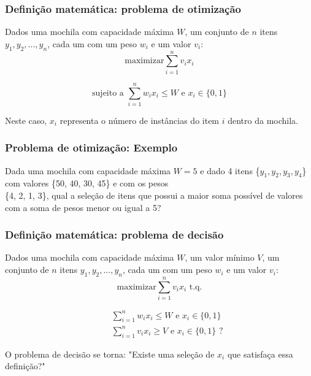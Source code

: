 \documentclass{beamer}
\begin{document}
\begin{frame}
\frametitle{Definição matemática: problema de otimização}

    Dados uma mochila com capacidade máxima $W$, um conjunto de $n$ itens $y_{1}, y_{2}, ..., y_{n}$,
    cada um com um peso $w_{i}$ e um valor $v_{i}$:\\

    \begin{equation*}
        \text{maximizar} \sum_{i=1}^{n} v_{i} x_{i}
    \end{equation*}

    \begin{equation*}
        \mbox{sujeito a } \sum_{i=1}^{n} w_{i} x_{i} \leq W \mbox{ e } x_{i} \in \{0,1\}
    \end{equation*}

    Neste caso, $x_{i}$ representa o número de instâncias do item $i$ dentro da mochila.

\end{frame}

\begin{frame}

\frametitle{Problema de otimização: Exemplo}
    Dada uma mochila com capacidade máxima $W = 5$ e dado 4 itens \{$y_{1}, y_{2}, y_{3}, y_{4}$\} com valores \{50, 40, 30, 45\} e com os pesos\\ \{4, 2, 1, 3\}, qual a seleção de itens que possui a maior soma possível de valores com a soma de pesos menor ou igual a 5?

\end{frame}

\begin{frame}
    \frametitle{Definição matemática: problema de decisão}

    Dados uma mochila com capacidade máxima $W$, um valor mínimo $V$, um conjunto de $n$ itens $y_{1}, y_{2}, ..., y_{n}$,
    cada um com um peso $w_{i}$ e um valor $v_{i}$:\\

    \begin{equation*}
        \text{maximizar} \sum_{i=1}^{n} v_{i} x_{i} \text{ t.q.}
    \end{equation*}

    \begin{equation*}
        \begin{split}
            &\quad \sum_{i=1}^{n} w_{i} x_{i} \leq W \mbox{ e } x_{i} \in \{0,1\} \\
            &\quad \sum_{i=1}^{n} v_{i} x_{i} \geq V \mbox{ e } x_{i} \in \{0,1\} \text{ ?}
        \end{split}
    \end{equation*}

    O problema de decisão se torna: "Existe uma seleção de $x_{i}$ que satisfaça essa definição?"

\end{frame}
\end{document}
